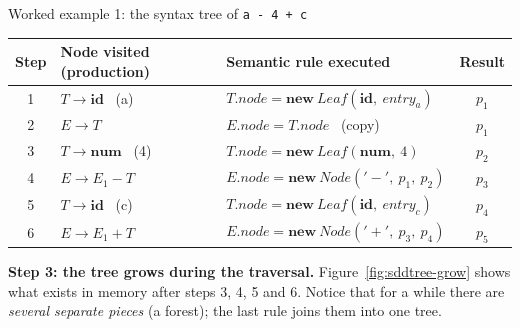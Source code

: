 \documentclass[11pt,a4paper]{article}
\newcommand{\at}[2]{\ensuremath{#1.\mathit{#2}}}
\newcommand{\tok}[1]{\ensuremath{\mathtt{#1}}}
\begin{document}
\begin{examplebox}{Worked example 1: the syntax tree of \texttt{a - 4 + c}}
\begin{center}
\small
\begin{tabular}{@{}c l l c@{}}
\toprule
\textbf{Step} & \textbf{Node visited (production)} & \textbf{Semantic rule executed} & \textbf{Result} \\ \midrule
1 & $T\to\mathbf{id}$ \ (a)   & $\at{T}{node}=\mathbf{new}\ \mathit{Leaf}(\mathbf{id},\ \mathit{entry}_a)$ & $p_1$ \\
2 & $E\to T$                  & $\at{E}{node}=\at{T}{node}$ \ (copy) & $p_1$ \\
3 & $T\to\mathbf{num}$ \ (4)  & $\at{T}{node}=\mathbf{new}\ \mathit{Leaf}(\mathbf{num},\ 4)$ & $p_2$ \\
4 & $E\to E_1-T$              & $\at{E}{node}=\mathbf{new}\ \mathit{Node}(\tok{'-'},\ p_1,\ p_2)$ & $p_3$ \\
5 & $T\to\mathbf{id}$ \ (c)   & $\at{T}{node}=\mathbf{new}\ \mathit{Leaf}(\mathbf{id},\ \mathit{entry}_c)$ & $p_4$ \\
6 & $E\to E_1+T$              & $\at{E}{node}=\mathbf{new}\ \mathit{Node}(\tok{'+'},\ p_3,\ p_4)$ & $p_5$ \\ \bottomrule
\end{tabular}
\end{center}

\textbf{Step 3: the tree grows during the traversal.} Figure~\ref{fig:sddtree-grow} shows what exists in memory after steps 3, 4, 5 and 6. Notice that for a while there are \emph{several separate pieces} (a forest); the last rule joins them into one tree.


\end{examplebox}
\end{document}
